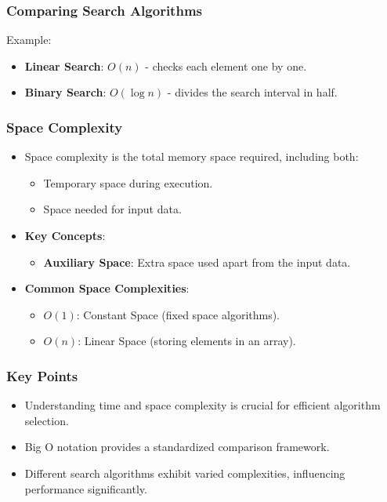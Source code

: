 \documentclass[aspectratio=169]{beamer}
\begin{document}
\begin{frame}
    \frametitle{Comparing Search Algorithms}
    Example:
    \begin{itemize}
        \item \textbf{Linear Search}: $O(n)$ - checks each element one by one.
        \item \textbf{Binary Search}: $O(\log n)$ - divides the search interval in half.
    \end{itemize}
\end{frame}

\begin{frame}
    \frametitle{Space Complexity}
    \begin{itemize}
        \item Space complexity is the total memory space required, including both:
        \begin{itemize}
            \item Temporary space during execution.
            \item Space needed for input data.
        \end{itemize}
        \item \textbf{Key Concepts}:
        \begin{itemize}
            \item \textbf{Auxiliary Space}: Extra space used apart from the input data.
        \end{itemize}
        \item \textbf{Common Space Complexities}:
        \begin{itemize}
            \item $O(1)$: Constant Space (fixed space algorithms).
            \item $O(n)$: Linear Space (storing elements in an array).
        \end{itemize}
    \end{itemize}
\end{frame}

\begin{frame}
    \frametitle{Key Points}
    \begin{itemize}
        \item Understanding time and space complexity is crucial for efficient algorithm selection.
        \item Big O notation provides a standardized comparison framework.
        \item Different search algorithms exhibit varied complexities, influencing performance significantly.
    \end{itemize}
\end{frame}
\end{document}
